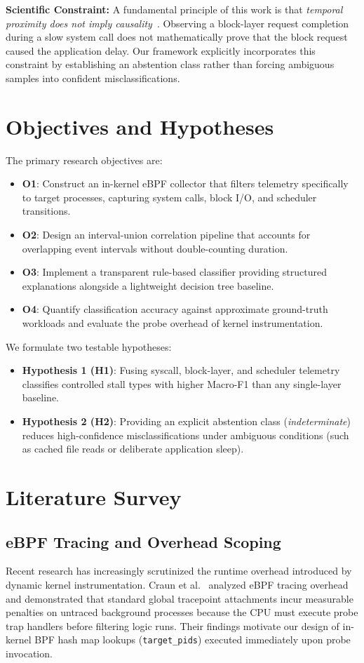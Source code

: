 \documentclass[conference]{IEEEtran}
\begin{document}
\noindent\textbf{Scientific Constraint:} A fundamental principle of this work is that \textit{temporal proximity does not imply causality}~\cite{curtsinger2015coz}. Observing a block-layer request completion during a slow system call does not mathematically prove that the block request caused the application delay. Our framework explicitly incorporates this constraint by establishing an abstention class rather than forcing ambiguous samples into confident misclassifications.

\section{Objectives and Hypotheses}
The primary research objectives are:
\begin{itemize}
    \item \textbf{O1}: Construct an in-kernel eBPF collector that filters telemetry specifically to target processes, capturing system calls, block I/O, and scheduler transitions.
    \item \textbf{O2}: Design an interval-union correlation pipeline that accounts for overlapping event intervals without double-counting duration.
    \item \textbf{O3}: Implement a transparent rule-based classifier providing structured explanations alongside a lightweight decision tree baseline.
    \item \textbf{O4}: Quantify classification accuracy against approximate ground-truth workloads and evaluate the probe overhead of kernel instrumentation.
\end{itemize}

\noindent We formulate two testable hypotheses:
\begin{itemize}
    \item \textbf{Hypothesis 1 (H1)}: Fusing syscall, block-layer, and scheduler telemetry classifies controlled stall types with higher Macro-F1 than any single-layer baseline.
    \item \textbf{Hypothesis 2 (H2)}: Providing an explicit abstention class (\textit{indeterminate}) reduces high-confidence misclassifications under ambiguous conditions (such as cached file reads or deliberate application sleep).
\end{itemize}

\section{Literature Survey}
\subsection{eBPF Tracing and Overhead Scoping}
Recent research has increasingly scrutinized the runtime overhead introduced by dynamic kernel instrumentation. Craun et al.~\cite{craun2024eliminating} analyzed eBPF tracing overhead and demonstrated that standard global tracepoint attachments incur measurable penalties on untraced background processes because the CPU must execute probe trap handlers before filtering logic runs. Their findings motivate our design of in-kernel BPF hash map lookups (\texttt{target\_pids}) executed immediately upon probe invocation. 
\end{document}
